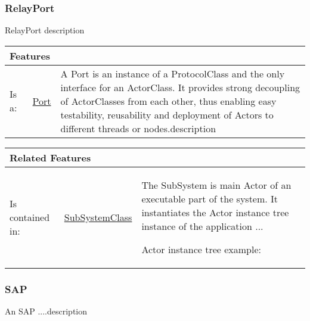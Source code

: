 			
		
		\subsubsection{RelayPort}
			\hypertarget{ref:RelayPort}{}
			
			RelayPort description
			
			
			\vspace{\baselineskip}
			\begingroup
			\renewcommand{\arraystretch}{1.8} %
			\parbox{\textwidth}{
			\begin{longtable}{l l p{}}
				\multicolumn{2}{l}{\textbf{\large Features}} & \\
				\hline
			Is a: & \tabitem \hyperlink{ref:Port}{Port}  & A Port is an instance of a ProtocolClass and the only interface for an ActorClass. It provides strong decoupling of ActorClasses from each other, thus enabling easy testability, reusability and deployment of Actors to different threads or nodes.description \\
			\hline
			\end{longtable}	
			}
			\endgroup
			\vspace{\baselineskip}
			
			\vspace{\baselineskip}
			\begingroup
			\renewcommand{\arraystretch}{1.8} %
			\parbox{\textwidth}{
			\begin{longtable}{l l p{}}
				\multicolumn{2}{l}{\textbf{\large Related Features}} & \\
				\hline
			Is contained in: & \tabitem \hyperlink{ref:SubSystemClass}{SubSystemClass}  & The SubSystem is main Actor of an executable part of the system. It instantiates the Actor instance tree instance of the application ...
				
				Actor instance tree example:
				\\
			\hline
			\end{longtable}	
			}
			\endgroup
			\vspace{\baselineskip}
			
			
		
		\subsubsection{SAP}
			\hypertarget{ref:SAP}{}
			
			An SAP ....description 
			
